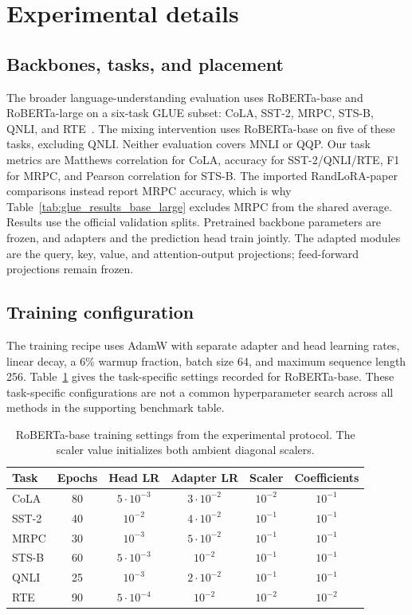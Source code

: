 \section{Experimental details}
\label{app:details}

\subsection{Backbones, tasks, and placement}
The broader language-understanding evaluation uses RoBERTa-base and RoBERTa-large on a six-task GLUE subset: CoLA, SST-2, MRPC, STS-B, QNLI, and RTE~\citep{wang2018glue}. The mixing intervention uses RoBERTa-base on five of these tasks, excluding QNLI. Neither evaluation covers MNLI or QQP. Our task metrics are Matthews correlation for CoLA, accuracy for SST-2/QNLI/RTE, F1 for MRPC, and Pearson correlation for STS-B. The imported RandLoRA-paper comparisons instead report MRPC accuracy, which is why Table~\ref{tab:glue_results_base_large} excludes MRPC from the shared average. Results use the official validation splits. Pretrained backbone parameters are frozen, and adapters and the prediction head train jointly. The adapted modules are the query, key, value, and attention-output projections; feed-forward projections remain frozen.

\subsection{Training configuration}
The training recipe uses AdamW with separate adapter and head learning rates, linear decay, a 6\% warmup fraction, batch size 64, and maximum sequence length 256. Table~\ref{tab:recipe} gives the task-specific settings recorded for RoBERTa-base. These task-specific configurations are not a common hyperparameter search across all methods in the supporting benchmark table.

\begin{table}[ht]
\centering
\caption{RoBERTa-base training settings from the experimental protocol. The scaler value initializes both ambient diagonal scalers.}
\label{tab:recipe}
\begin{tabular}{lccccc}
\toprule
Task & Epochs & Head LR & Adapter LR & Scaler & Coefficients\\
\midrule
CoLA & 80 & $5\cdot10^{-3}$ & $3\cdot10^{-2}$ & $10^{-2}$ & $10^{-1}$\\
SST-2 & 40 & $10^{-2}$ & $4\cdot10^{-2}$ & $10^{-1}$ & $10^{-1}$\\
MRPC & 30 & $10^{-3}$ & $5\cdot10^{-2}$ & $10^{-1}$ & $10^{-1}$\\
STS-B & 60 & $5\cdot10^{-3}$ & $10^{-2}$ & $10^{-1}$ & $10^{-1}$\\
QNLI & 25 & $10^{-3}$ & $2\cdot10^{-2}$ & $10^{-1}$ & $10^{-1}$\\
RTE & 90 & $5\cdot10^{-4}$ & $10^{-2}$ & $10^{-2}$ & $10^{-2}$\\
\bottomrule
\end{tabular}
\end{table}

